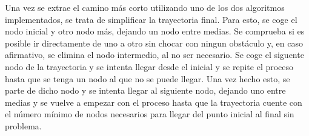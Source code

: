 Una vez se extrae el camino más corto utilizando uno de los dos algoritmos implementados, se trata de simplificar la trayectoria final. Para esto, se coge el nodo inicial y otro nodo más, dejando un nodo entre medias. Se comprueba si es posible ir directamente de uno a otro sin chocar con ningun obstáculo y, en caso afirmativo, se elimina el nodo intermedio, al no ser necesario. Se coge el siguente nodo de la trayectoria y se intenta llegar desde el inicial y se repite el proceso hasta que se tenga un nodo al que no se puede llegar. Una vez hecho esto, se parte de dicho nodo y se intenta llegar al siguiente nodo, dejando uno entre medias y se vuelve a empezar con el proceso hasta que la trayectoria cuente con el número mínimo de nodos necesarios para llegar del punto inicial al final sin problema.\\

